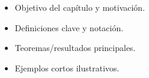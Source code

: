 \begin{itemize}
  \item Objetivo del capítulo y motivación.
  \item Definiciones clave y notación.
  \item Teoremas/resultados principales.
  \item Ejemplos cortos ilustrativos.
\end{itemize}
